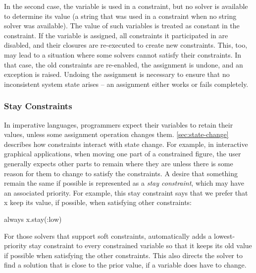 In the second case, the variable is used in a constraint, but no
solver is available to determine its value (\eg a string that was used
in a constraint when no string solver was available). The value of
such variables is treated as constant in the constraint. If the
variable is assigned, all constraints it participated in are disabled,
and their closures are re-executed to create new constraints. This,
too, may lead to a situation where some solvers cannot satisfy their
constraints. In that case, the old constraints are re-enabled, the
assignment is undone, and an exception is raised. Undoing the
assignment is necessary to ensure that no inconsistent system state
arises -- an assignment either works or fails completely.

\subsubsection{Stay Constraints}
In imperative languages, programmers expect their variables to retain
their values, unless some assignment operation changes them.
\autoref{sec:state-change} describes how constraints interact with
state change. For example, in interactive graphical applications, when
moving one part of a constrained figure, the user generally expects
other parts to remain where they are unless there is some reason for
them to change to satisfy the constraints.  A desire that something
remain the same if possible is represented as a \emph{stay
  constraint}, which may have an associated priority.  For example,
this stay constraint says that we prefer that x keep its value, if
possible, when satisfying other constraints:
\begin{code}[numbers=none]
always { x.stay(:low) }
\end{code}

For those solvers that support soft constraints, \langname
automatically adds a lowest-priority stay constraint to every
constrained variable so that it keeps its old value if possible when
satisfying the other constraints. This also directs the solver to find
a solution that is close to the prior value, if a variable does have
to change.

